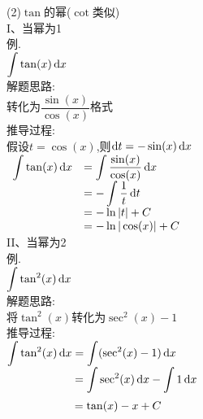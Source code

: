 (2)$\tan$的幂($\cot$类似)\\
I、当幂为1\\
例.\\
$\displaystyle\int\tan(x)\mathop{}\!\mathrm{d} x$\\
解题思路:\\
转化为$\dfrac{\sin(x)}{\cos(x)}$格式\\
推导过程:\\
假设$t=\cos(x)$,则$\mathop{}\!\mathrm{d} t=-\sin(x)\mathop{}\!\mathrm{d} x$\\
$\begin{array}{>{\displaystyle}r >{\displaystyle}l}
\int\tan(x)\dif x & =\int\dfrac{\sin(x)}{\cos(x)}\dif x\\
& =-\int\dfrac{1}{t}\dif t\\
& =-\ln|t|+C\\
& =-\ln|\cos(x)|+C
\end{array}$\\[2ex]

II、当幂为2\\
例.\\
$\displaystyle\int\tan^2(x)\mathop{}\!\mathrm{d} x$\\
解题思路:\\
将$\tan^2(x)$转化为$\sec^2(x)-1$\\
推导过程:\\
$\displaystyle\int\tan^2(x)\mathop{}\!\mathrm{d} x=\int(\sec^2(x)-1)\mathop{}\!\mathrm{d} x$\\
$\displaystyle\phantom{\int\tan^2(x)\dif x}=\int\sec^2(x)\dif x-\int 1\dif x$\\
$\displaystyle\phantom{\int\tan^2(x)\dif x}=\tan(x)-x+C$\\[2ex]

